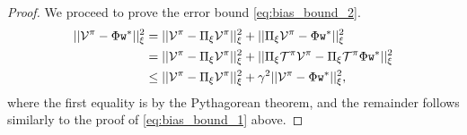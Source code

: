 \begin{proof}
We proceed to prove the error bound \eqref{eq:bias_bound_2}.
\begin{equation}
\begin{split}
  ||\mathcal{V}^\pi - \Phi {\tt w}^*||_\xi^2  &= ||\mathcal{V}^\pi
-\Pi_\xi \mathcal{V}^\pi||_\xi^2 + ||\Pi_\xi \mathcal{V}^\pi -\Phi {\tt w}^*||_\xi^2  \\
    &= ||\mathcal{V}^\pi -\Pi_\xi \mathcal{V}^\pi||_\xi^2 + ||\Pi_\xi \mathcal{T}^\pi \mathcal{V}^\pi -\Pi_\xi \mathcal{T}^\pi\Phi {\tt w}^*||_\xi^2 \\
&\leq ||\mathcal{V}^\pi -\Pi_\xi \mathcal{V}^\pi||_\xi^2 + \gamma^2||\mathcal{V}^\pi-\Phi {\tt w}^*||_\xi^2,
\end{split}
\end{equation}
where the first equality is by the Pythagorean theorem, and the remainder follows similarly to the proof of \eqref{eq:bias_bound_1} above.

\end{proof}

